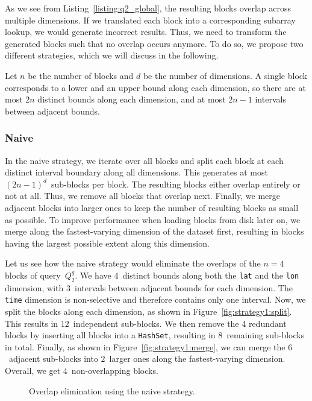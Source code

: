 \documentclass[conference]{IEEEtran}
\newcommand{\smalltt}[1]{{\texttt{\small #1}}}
\begin{document}
As we see from Listing~\ref{listing:q2_global}, the resulting blocks overlap across multiple dimensions. If we translated each block into a corresponding subarray lookup, we would generate incorrect results. Thus, we need to transform the generated blocks such that no overlap occurs anymore. To do so, we propose two different strategies, which we will discuss in the following. 

Let $n$ be the number of blocks and $d$ be the number of dimensions.
A single block corresponds to a lower and an upper bound along each dimension,
so there are at most $2n$ distinct bounds along each dimension, and at most $2n - 1$ intervals between adjacent bounds.

\subsubsection{Naive}
\label{sssec:strategy1}
In the naive strategy, we iterate over all blocks and split each block at each distinct interval boundary along all dimensions. This generates at most $(2n - 1)^d$~sub-blocks per block. The resulting blocks either overlap entirely or not at all. Thus, we remove all blocks that overlap next. Finally, we merge adjacent blocks into larger ones to keep the number of resulting blocks as small as possible. To improve performance when loading blocks from disk later on, we merge along the fastest-varying dimension of the dataset first, resulting in blocks having the largest possible extent along this dimension. 

Let us see how the naive strategy would eliminate the overlaps of the $n=4$ blocks of query~$Q_2^g$. We have $4$~distinct bounds along both the \smalltt{lat} and the \smalltt{lon} dimension, with $3$~intervals between adjacent bounds for each dimension. The \smalltt{time} dimension is non-selective and therefore contains only one interval. Now, we split the blocks along each dimension, as shown in Figure~\ref{fig:strategy1:split}. This results in $12$~independent sub-blocks. We then remove the 4 redundant blocks by inserting all blocks into a \smalltt{HashSet}, resulting in $8$~remaining sub-blocks in total. Finally, as shown in Figure~\ref{fig:strategy1:merge}, we can merge the $6$~adjacent sub-blocks into $2$~larger ones along the fastest-varying dimension. Overall, we get $4$~non-overlapping blocks.


\begin{figure}[h!]
\vspace*{-0.3cm}
\quad
{}
\caption{Overlap elimination using the naive strategy.}
\vspace*{-0.4cm}
\label{fig:strategy1}
\end{figure}
\end{document}
